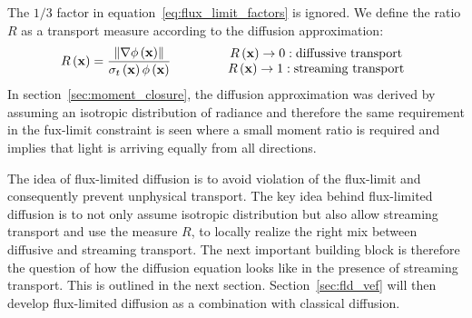 The $1/3$ factor in equation~\ref{eq:flux_limit_factors} is ignored. We define the ratio $R$ as a transport measure according to the diffusion approximation:
\begin{align}
\label{eq:fld_transport_measure_R}
R\left(\boldsymbol{\mathbf{x}}\right)
= 
\frac{\left\lVert\nabla\phi\left(\boldsymbol{\mathbf{x}}\right)\right\rVert}{\sigma_t\left(\boldsymbol{\mathbf{x}}\right)\phi\left(\boldsymbol{\mathbf{x}}\right)}
\qquad
\qquad
\begin{array}{cc}
R\left(\boldsymbol{\mathbf{x}}\right)\rightarrow 0 : \text{diffussive transport}\\
R\left(\boldsymbol{\mathbf{x}}\right)\rightarrow 1 : \text{streaming transport}
\end{array}
\end{align}
In section~\ref{sec:moment_closure}, the diffusion approximation was derived by assuming an isotropic distribution of radiance and therefore the same requirement in the fux-limit constraint is seen where a small moment ratio is required and implies that light is arriving equally from all directions.

The idea of flux-limited diffusion is to avoid violation of the flux-limit and consequently prevent unphysical transport. The key idea behind flux-limited diffusion is to not only assume isotropic distribution but also allow streaming transport and use the measure $R$, to locally realize the right mix between diffusive and streaming transport. The next important building block is therefore the question of how the diffusion equation looks like in the presence of streaming transport. This is outlined in the next section. Section~\ref{sec:fld_vef} will then develop flux-limited diffusion as a combination with classical diffusion.
